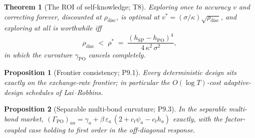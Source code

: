 \documentclass[11pt]{article}
\newtheorem{theorem}{Theorem}
\newtheorem{proposition}{Proposition}
\newcommand{\eps}{\varepsilon}
\newcommand{\gpo}{\gamma_{\mathrm{PO}}}
\newcommand{\Gpo}{\Gamma_{\mathrm{PO}}}
\newcommand{\hpo}{h_{\mathrm{PO}}}
\newcommand{\hsp}{h_{\mathrm{SP}}}
\begin{document}
\begin{theorem}[The ROI of self-knowledge; T8]
Exploring once to accuracy $v$ and correcting forever, discounted at
$\rho_{\mathrm{disc}}$, is optimal at
$v^{*} = (\sigma/\kappa)\sqrt{\rho_{\mathrm{disc}}}$, and exploring at all
is worthwhile iff
\[
\rho_{\mathrm{disc}} \;<\; \rho^{*} \;=\;
\frac{(\hsp - \hpo)^4}{4\,\kappa^2\,\sigma^2},
\]
in which the curvature $\gpo$ cancels completely.
\end{theorem}

\begin{proposition}[Frontier consistency; P9.1]
Every deterministic design sits exactly on the exchange-rate frontier; in
particular the $O(\log T)$-cost adaptive-design schedules of Lai--Robbins.
\end{proposition}

\begin{proposition}[Separable multi-bond curvature; P9.3]
In the separable multi-bond market,
$(\Gpo)_{aa} = \gamma_a + \beta\,\eps_a\,(2 + c_t\psi_a - c_t h_a)$
exactly, with the factor-coupled case holding to first order in the
off-diagonal response.
\end{proposition}

\end{document}

